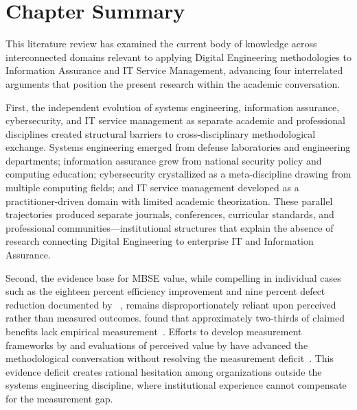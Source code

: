 \section{Chapter Summary}

This literature review has examined the current body of knowledge across interconnected domains relevant to applying Digital Engineering methodologies to Information Assurance and IT Service Management, advancing four interrelated arguments that position the present research within the academic conversation.

First, the independent evolution of systems engineering, information assurance, cybersecurity, and IT service management as separate academic and professional disciplines created structural barriers to cross-disciplinary methodological exchange. Systems engineering emerged from defense laboratories and engineering departments; information assurance grew from national security policy and computing education; cybersecurity crystallized as a meta-discipline drawing from multiple computing fields; and IT service management developed as a practitioner-driven domain with limited academic theorization. These parallel trajectories produced separate journals, conferences, curricular standards, and professional communities---institutional structures that explain the absence of research connecting Digital Engineering to enterprise IT and Information Assurance.

Second, the evidence base for MBSE value, while compelling in individual cases such as the eighteen percent efficiency improvement and nine percent defect reduction documented by \citeauthor{Rogers_Mitchell_2021}~\parencite{Rogers_Mitchell_2021}, remains disproportionately reliant upon perceived rather than measured outcomes. \citeauthor{Henderson_Salado_2021} found that approximately two-thirds of claimed benefits lack empirical measurement~\parencite{Henderson_Salado_2021}. Efforts to develop measurement frameworks by \citeauthor{Henderson_2023_Metrics} and evaluations of perceived value by \citeauthor{Campo_2023} have advanced the methodological conversation without resolving the measurement deficit~\parencite{Henderson_2023_Metrics, Campo_2023}. This evidence deficit creates rational hesitation among organizations outside the systems engineering discipline, where institutional experience cannot compensate for the measurement gap.

